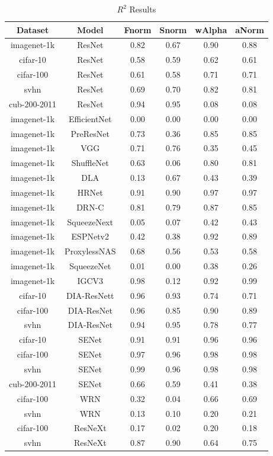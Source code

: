 \begin{table}[t]
\small
\begin{center}
\begin{tabular}{|c|c|c|c|c|c|}
Dataset & Model & Fnorm & Snorm & wAlpha & aNorm \\
\hline
imagenet-1k & ResNet  & 0.82 &  0.67 & 0.90 & 0.88 \\
 cifar-10 & ResNet  & 0.58 &  0.59 & 0.62 & 0.61 \\
 cifar-100 & ResNet  & 0.61 &  0.58 & 0.71 & 0.71 \\
 svhn & ResNet  & 0.69 &  0.70 & 0.82 & 0.81 \\
 cub-200-2011 & ResNet  & 0.94 &  0.95 & 0.08 & 0.08 \\
 imagenet-1k & EfficientNet  & 0.00 &  0.00 & 0.00 & 0.00 \\
 imagenet-1k & PreResNet  & 0.73 &  0.36 & 0.85 & 0.85 \\
 imagenet-1k & VGG  & 0.71 &  0.76 & 0.35 & 0.45 \\
 imagenet-1k & ShuffleNet  & 0.63 &  0.06 & 0.80 & 0.81 \\
 imagenet-1k & DLA  & 0.13 &  0.67 & 0.43 & 0.39 \\
 imagenet-1k & HRNet  & 0.91 &  0.90 & 0.97 & 0.97 \\
 imagenet-1k & DRN-C  & 0.81 &  0.79 & 0.87 & 0.85 \\
 imagenet-1k & SqueezeNext  & 0.05 &  0.07 & 0.42 & 0.43 \\
 imagenet-1k & ESPNetv2  & 0.42 &  0.38 & 0.92 & 0.89 \\
 imagenet-1k & ProxylessNAS  & 0.68 &  0.56 & 0.53 & 0.58 \\
 imagenet-1k & SqueezeNet  & 0.01 &  0.00 & 0.38 & 0.26 \\
 imagenet-1k & IGCV3  & 0.98 &  0.12 & 0.92 & 0.99 \\
 cifar-10 & DIA-ResNett  & 0.96 &  0.93 & 0.74 & 0.71 \\
 cifar-100 & DIA-ResNet  & 0.96 &  0.85 & 0.90 & 0.89 \\
 svhn & DIA-ResNet  & 0.94 &  0.95 & 0.78 & 0.77 \\
 cifar-10 & SENet  & 0.91 &  0.91 & 0.96 & 0.96 \\
 cifar-100 & SENet  & 0.97 &  0.96 & 0.98 & 0.98 \\
 svhn & SENet & 0.99 &  0.96 & 0.98 & 0.98 \\
 cub-200-2011 & SENet  & 0.66 &  0.59 & 0.41 & 0.38 \\
 cifar-100 & WRN  & 0.32 &  0.04 & 0.66 & 0.69 \\
 svhn & WRN  & 0.13 &  0.10 & 0.20 & 0.21 \\
 cifar-100 & ResNeXt  & 0.17 &  0.02 & 0.20 & 0.18 \\
 svhn & ResNeXt  & 0.87 &  0.90 & 0.64 & 0.75 \\
\hline
\end{tabular}
\end{center}
\caption{$R^{2}$ Results}
\label{table:R2results}
\end{table}
